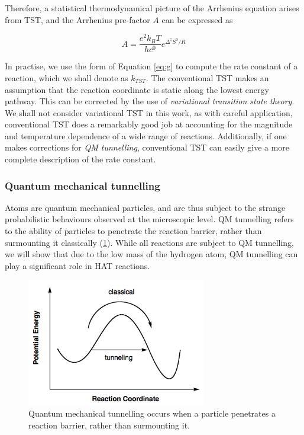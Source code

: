 Therefore, a statistical thermodynamical picture of the Arrhenius equation
arises from TST, and the Arrhenius pre-factor $A$ can be expressed as

\begin{equation}
  A = \frac{e^2k_BT}{hc^0}e^{\Delta^\ddagger S^0/R}
\end{equation}

In practise, we use the form of Equation \ref{eq:g} to compute the rate constant
of a reaction, which we shall denote as $k_{TST}$. The conventional TST makes an
assumption that the reaction coordinate is static along the lowest energy
pathway. This can be corrected by the use of \emph{variational transition state
  theory}.\cite{Truhlar1984} We shall not consider variational TST in this work,
as with careful application, conventional TST does a remarkably good job at
accounting for the magnitude and temperature dependence of a wide range of
reactions.\cite{Steinfeld1998} Additionally, if one makes corrections for
\emph{QM tunnelling}, conventional TST can easily give a more complete
description of the rate constant.

\subsubsection{Quantum mechanical tunnelling}

Atoms are quantum mechanical particles, and are thus subject to the strange
probabilistic behaviours observed at the microscopic level. QM tunnelling refers
to the ability of particles to penetrate the reaction barrier, rather than
surmounting it classically (\ref{fig:tunnelling}). While all reactions are
subject to QM tunnelling, we will show that due to the low mass of the hydrogen
atom, QM tunnelling can play a significant role in HAT reactions.

\begin{figure}[htb]
  \centering
  \includegraphics[width=0.7\textwidth]{figures/tunnelling}
  \caption{Quantum mechanical tunnelling occurs when a particle penetrates a
    reaction barrier, rather than surmounting it. }
  \label{fig:tunnelling}
\end{figure}


